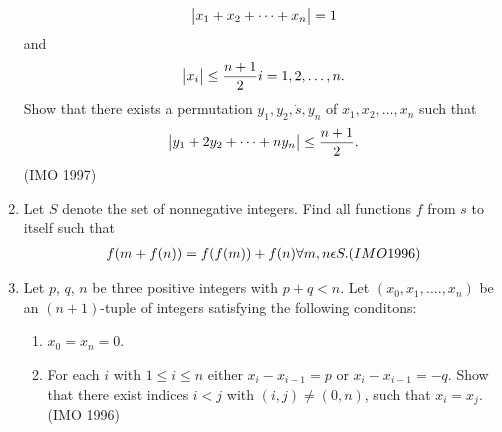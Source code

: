 \begin{enumerate}
  \begin{align}                                    
\begin{vmatrix}x_1+x_2+\dots+x_n\end{vmatrix}=1
 \end{align}                                         and                                               
\begin{align}                                         \begin{vmatrix}x_i\end{vmatrix}\leq\frac{n+1}{2}      {i=1,2,\dots,n}. \end{align}                                      
Show that there exists a permutation ${y_1, y_2,\dot    s,y_n}$ of ${x_1, x_2,\dots,x_n}$ such that    
\begin{align}                                     
\begin{vmatrix}y_1+2y_2+\dots+ny_n\end{vmatrix}\leq\frac{n+1}{2}.     
\end{align}\hfill(IMO 1997)
\item Let $S$ denote the set of nonnegative integers. Find all functions $f$ from $s$ to itself such that
 \begin{align}
f(m+f(n))=f(f(m))+f(n)
    \forall{m}, n \epsilon S. \hfill(IMO 1996)
 \end{align}
\item Let $p$, $q$, $n$ be three positive integers with $p+q<n$. Let $(x_0, x_1,....,x_n)$ be an $(n+1)$-tuple of integers satisfying the following conditons:
  \begin{enumerate}                                
 \item $x_0=x_n=0$.                       
\item For each $i$ with $1\leq{i}\leq{n}$
either $x _i-x_{i-1}=p$ or $x_i-x_{i-1}=-q$.  
Show that there exist indices $i < j$ with $(i,j) \neq(0,n)$, such that $x_i=x_j$.\hfill(IMO 1996)
  \end{enumerate}	

\end{enumerate}

